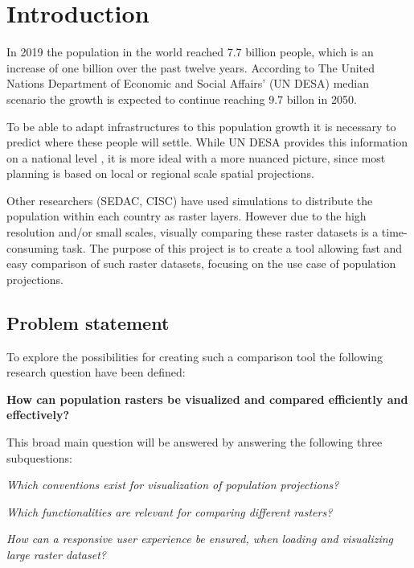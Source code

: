 \chapter{Introduction}
In 2019 the population in the world reached 7.7 billion people, which is an increase of one billion over the past twelve years. According to The United Nations Department of Economic and Social Affairs’ (UN DESA) median scenario the growth is expected to continue reaching 9.7 billon in 2050. \citep{UNDEASHightlights} 

To be able to adapt infrastructures to this population growth it is necessary to predict where these people will settle. While UN DESA provides this information on a national level \citep{NationalPop}, it is more ideal with a more nuanced picture, since most planning is based on local or regional scale spatial projections. \citep{WhyDetailedPop}

Other researchers (SEDAC, CISC) have used simulations to distribute the population within each country as raster layers. However due to the high resolution and/or small scales, visually comparing these raster datasets is a time-consuming task. The purpose of this project is to create a tool allowing fast and easy comparison of such raster datasets, focusing on the use case of population projections.


\section{Problem statement}

To explore the possibilities for creating such a comparison tool the following research question have been defined:

\textbf{How can population rasters be visualized and compared efficiently and effectively?}

This broad main question will be answered by answering the following three subquestions:

\textit{Which conventions exist for visualization of population projections?}

\textit{Which functionalities are relevant for comparing different rasters?}

\textit{How can a responsive user experience be ensured, when loading and visualizing large raster dataset?}


